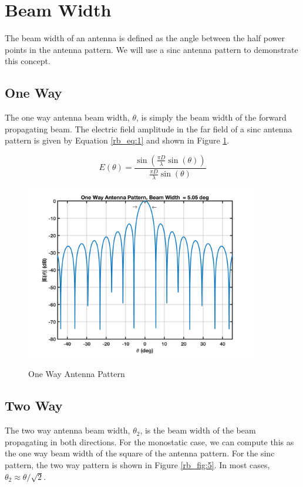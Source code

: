 \section{Beam Width}
The beam width of an antenna is defined as the angle between the half power points in the antenna pattern. We will use a sinc antenna pattern to demonstrate this concept.

\subsection{One Way}
The one way antenna beam width, $\theta$, is simply the beam width of the forward propagating beam. The electric field amplitude in the far field of a sinc antenna pattern is given by Equation \ref{rb_eq:1} and shown in Figure \ref{rb_fig:4}.

\begin{equation}
\label{rb_eq:1}
E(\theta) = \frac{\sin\left(\frac{\pi D}{\lambda}\sin(\theta) \right)}{\frac{\pi D}{\lambda}\sin(\theta)}
\end{equation}

\begin{figure}[H]
  \begin{center}
\includegraphics[width=4in]{../media/multistatic/sinc_antenna_pattern_one_way.png}
  \end{center}
  \renewcommand{\baselinestretch}{1} \small\normalsize
  \begin{quote}
    \caption[One Way Antenna Pattern]{One Way Antenna Pattern\label{rb_fig:4}}
  \end{quote}
\end{figure}
\renewcommand{\baselinestretch}{2} \small\normalsize

\subsection{Two Way}
The two way antenna beam width, $\theta_2$, is the beam width of the beam propagating in both directions. For the monostatic case, we can compute this as the one way beam width of the square of the antenna pattern. For the sinc pattern, the two way pattern is shown in Figure \ref{rb_fig:5}. In most cases, $\theta_2 \approx \theta/\sqrt{2}$.

